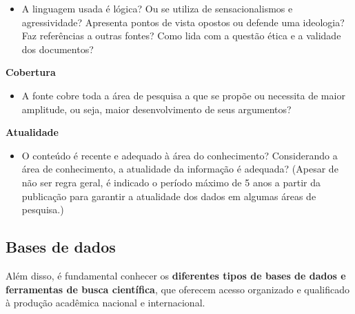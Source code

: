 \documentclass[
  letterpaper,
  DIV=11,
  numbers=noendperiod]{scrreprt}
\providecommand{\tightlist}{%
  \setlength{\itemsep}{0pt}\setlength{\parskip}{0pt}}
\begin{document}
\begin{itemize}
\tightlist
\item
  A linguagem usada é lógica? Ou se utiliza de sensacionalismos e
  agressividade? Apresenta pontos de vista opostos ou defende uma
  ideologia? Faz referências a outras fontes? Como lida com a questão
  ética e a validade dos documentos?
\end{itemize}

\textbf{Cobertura}

\begin{itemize}
\tightlist
\item
  A fonte cobre toda a área de pesquisa a que se propõe ou necessita de
  maior amplitude, ou seja, maior desenvolvimento de seus argumentos?
\end{itemize}

\textbf{Atualidade}

\begin{itemize}
\tightlist
\item
  O conteúdo é recente e adequado à área do conhecimento? Considerando a
  área de conhecimento, a atualidade da informação é adequada? (Apesar
  de não ser regra geral, é indicado o período máximo de 5 anos a partir
  da publicação para garantir a atualidade dos dados em algumas áreas de
  pesquisa.)
\end{itemize}

\subsection{Bases de dados}\label{bases-de-dados}

Além disso, é fundamental conhecer os \textbf{diferentes tipos de bases
de dados e ferramentas de busca científica}, que oferecem acesso
organizado e qualificado à produção acadêmica nacional e internacional.
\end{document}
